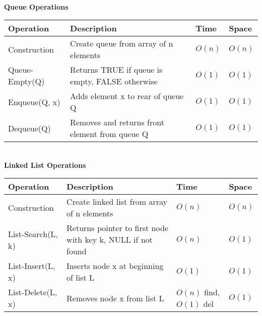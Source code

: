 {{\begin{minipage}[t]{0.54\textwidth}
\begin{tabular}{|p{}|p{}|p{}|p{}|}
\hline
\end{tabular}\\
\textbf{\tiny Queue Operations}\\
\begin{tabular}{|p{}|p{}|p{}|p{}|}
\hline
\textbf{Operation} & \textbf{Description} & \textbf{Time} & \textbf{Space} \\
\hline
Construction & Create queue from array of n elements & $O(n)$ & $O(n)$ \\
\hline
Queue-Empty(Q) & Returns TRUE if queue is empty, FALSE otherwise & $O(1)$ & $O(1)$ \\
\hline
Enqueue(Q, x) & Adds element x to rear of queue Q & $O(1)$ & $O(1)$ \\
\hline
Dequeue(Q) & Removes and returns front element from queue Q & $O(1)$ & $O(1)$ \\
\hline
\end{tabular}\\
\textbf{Linked List Operations}\\
\begin{tabular}{|p{}|p{}|p{}|p{}|}
\hline
\textbf{Operation} & \textbf{Description} & \textbf{Time} & \textbf{Space} \\
\hline
Construction & Create linked list from array of n elements & $O(n)$ & $O(n)$ \\
\hline
List-Search(L, k) & Returns pointer to first node with key k, NULL if not found & $O(n)$ & $O(1)$ \\
\hline
List-Insert(L, x) & Inserts node x at beginning of list L & $O(1)$ & $O(1)$ \\
\hline
List-Delete(L, x) & Removes node x from list L & $O(n)$ find, $O(1)$ del & $O(1)$ \\
\hline
\end{tabular}\\
\end{minipage}
}} 